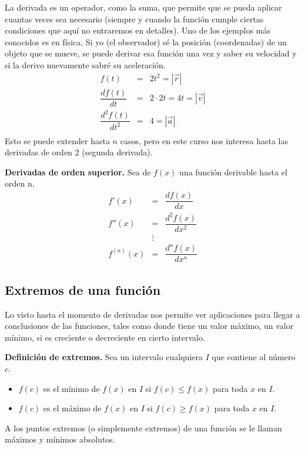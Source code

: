 La derivada es un operador, como la suma, que permite que se pueda aplicar cuantas veces sea necesario (siempre y cuando la función cumple ciertas condiciones que aquí no entraremos en detalles). Uno de los ejemplos más conocidos es en física. Si yo (el observador) sé la posición (coordenadas) de un objeto que se mueve, se puede derivar esa función una vez y saber su velocidad y si la derivo nuevamente sabré su aceleración.
\begin{eqnarray*}
f(t)&=& 2t^{2}=|\vec{r}|\\
\dfrac{df(t)}{dt}&=&2\cdot 2t=4t=|\vec{v}|\\
\dfrac{d^{2}f(t)}{dt^{2}}&=&4= |\vec{a}|\\
\end{eqnarray*} 
Esto se puede extender hasta $n$ casos, pero en este curso nos interesa hasta las derivadas de orden 2 (segunda derivada).

\begin{mydef}
\textbf{Derivadas de orden superior. } Sea de $f(x)$ una función derivable hasta el orden n. 
\begin{eqnarray}
f'(x)&=&\dfrac{df(x)}{dx}\\
f''(x)&=&\dfrac{d^{2}f(x)}{dx^{2}}\\
&\vdots  &\nonumber\\
f^{(n)}(x)&=&\dfrac{d^{n}f(x)}{dx^{n}}
\end{eqnarray}
\end{mydef}

\subsection{Extremos de una función}
Lo visto hasta el momento de derivadas nos permite ver aplicaciones para llegar a conclusiones de las funciones, tales como donde tiene un valor máximo, un valor mínimo, si es creciente o decreciente en cierto intervalo. 

\begin{mydef}
\textbf{Definición de extremos. } Sea un intervalo cualquiera $I$ que contiene al número $c$.
\begin{itemize}
	\item $f(c)$ es el mínimo de $f(x)$ en $I$ si $f(c)\leq f(x)$ para toda $x$ en $I$.\\
	 
	\item $f(c)$ es el máximo de $f(x)$ en $I$ si $f(c)\geq f(x)$ para toda $x$ en $I$. 
\end{itemize}
A los puntos extremos (o simplemente extremos) de una función se le llaman máximos y mínimos absolutos. 
\end{mydef}

